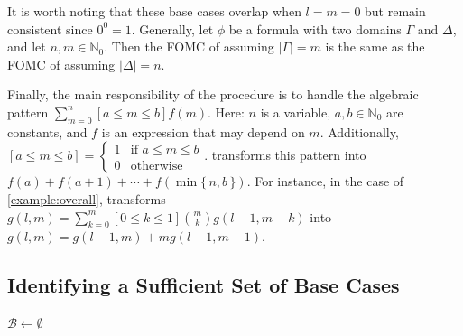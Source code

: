 \documentclass[a4paper,UKenglish,cleveref, autoref, thm-restate]{lipics-v2021}
\begin{document}
It is worth noting that these base cases overlap when $l = m = 0$ but remain
consistent since $0^{0} = 1$. Generally, let $\phi$ be a formula with two
domains $\Gamma$ and $\Delta$, and let $n, m \in \mathbb{N}_{0}$. Then the FOMC
of  assuming $|\Gamma| = m$ is the same as the
FOMC of  assuming $|\Delta| = n$.

Finally, the main responsibility of the \Simplify procedure is to handle the
algebraic pattern $\sum_{m=0}^{n}[a \le m \le b] f(m)$. Here: $n$ is a variable,
$a, b \in \mathbb{N}_{0}$ are constants, and $f$ is an expression that may
depend on $m$. Additionally, $[a \le m \le b] = \begin{cases}
  1 & \text{if $a \le m \le b$} \\
  0 & \text{otherwise}
\end{cases}$.
\Simplify transforms this pattern into
$f(a) + f(a+1) + \cdots + f(\min\{\, n, b \,\})$. For instance, in the case of
\cref{example:overall}, \Simplify transforms
$g(l, m) = \sum_{k=0}^{m}[0 \le k \le 1]\binom{m}{k}g(l-1, m-k)$ into
$g(l, m) = g(l-1, m) + mg(l-1, m-1)$.

\subsection{Identifying a Sufficient Set of Base Cases}\label{sec:identifying}


\begin{algorithm}[t]
  \caption{\protect{}}\label{alg:findbasecases}

  $\mathcal{B} \gets \emptyset$\;
\end{algorithm}
\end{document}
